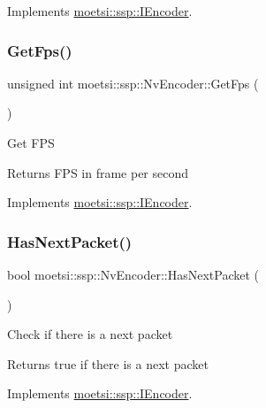 Implements \hyperlink{classmoetsi_1_1ssp_1_1IEncoder_ad5179efaa4c74207766dd64f46f4059a}{moetsi\+::ssp\+::\+I\+Encoder}.

\mbox{\label{classmoetsi_1_1ssp_1_1NvEncoder_ab94b826f2aef05afad376132743001d9}} 
\subsubsection{\texorpdfstring{Get\+Fps()}{GetFps()}}
{\footnotesize\ttfamily unsigned int moetsi\+::ssp\+::\+Nv\+Encoder\+::\+Get\+Fps (\begin{DoxyParamCaption}{ }\end{DoxyParamCaption})\hspace{0.3cm}{\ttfamily [virtual]}}

Get F\+PS \begin{DoxyReturn}{Returns}
F\+PS in frame per second 
\end{DoxyReturn}


Implements \hyperlink{classmoetsi_1_1ssp_1_1IEncoder_ae6a865aa52230d81aed1cb5232402f6c}{moetsi\+::ssp\+::\+I\+Encoder}.

\mbox{\label{classmoetsi_1_1ssp_1_1NvEncoder_a4c0874d9d0d767ae7a33fe9c9a1be1de}} 
\subsubsection{\texorpdfstring{Has\+Next\+Packet()}{HasNextPacket()}}
{\footnotesize\ttfamily bool moetsi\+::ssp\+::\+Nv\+Encoder\+::\+Has\+Next\+Packet (\begin{DoxyParamCaption}{ }\end{DoxyParamCaption})\hspace{0.3cm}{\ttfamily [virtual]}}

Check if there is a next packet \begin{DoxyReturn}{Returns}
true if there is a next packet 
\end{DoxyReturn}


Implements \hyperlink{classmoetsi_1_1ssp_1_1IEncoder_a2af8e23d841ef61f6ee4037e56a3694d}{moetsi\+::ssp\+::\+I\+Encoder}.

